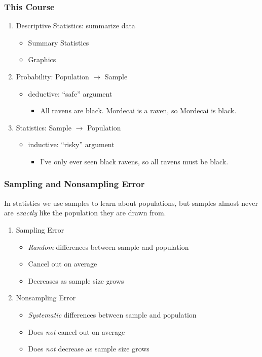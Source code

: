 \documentclass[handout]{beamer}
\begin{document}
\begin{frame}

\frametitle{This Course}

\begin{enumerate}
	\item Descriptive Statistics: summarize data
		\begin{itemize}
			\item Summary Statistics
			\item Graphics
		\end{itemize}
	\item Probability: Population $\rightarrow$ Sample
		\begin{itemize}
			\item deductive: ``safe'' argument
				\begin{itemize}
					\item All ravens are black. Mordecai is a raven, so Mordecai is black.
				\end{itemize}
		\end{itemize}
	\item Statistics: Sample $\rightarrow$ Population
		\begin{itemize}
			\item inductive: ``risky'' argument
				\begin{itemize}
					\item I've only ever seen black ravens, so all ravens must be black.
				\end{itemize}
		 \end{itemize}
\end{enumerate}


\end{frame}
\begin{frame}
\frametitle{Sampling and Nonsampling Error}
In statistics we use samples to learn about populations, but samples almost never are \emph{exactly} like the population they are drawn from.
	\begin{enumerate}
		\item Sampling Error 
			\begin{itemize}
				\item \emph{Random} differences between sample and population
				\item Cancel out on average
				\item Decreases as sample size grows
			\end{itemize}
		\item Nonsampling Error
			\begin{itemize}
				\item \emph{Systematic} differences between sample and population 
				\item Does \emph{not} cancel out on average
				\item Does \emph{not} decrease as sample size grows
			\end{itemize}
	\end{enumerate}
\end{frame}
\end{document}
